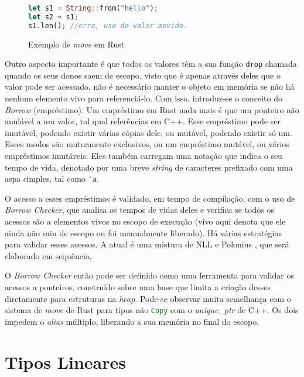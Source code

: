 \begin{figure}[ht]
	\caption{Exemplo de \emph{move} em Rust}
	\label{fig:ex:move}
	\begin{lstlisting}[language=Rust]
let s1 = String::from("hello");
let s2 = s1;
s1.len(); //erro, uso de valor movido.
	\end{lstlisting}
\end{figure}

Outro aspecto importante é que todos os valores têm a sua função \lstinline[language=Rust]|drop| chamada quando os seus donos saem de escopo, visto que é apenas através deles que o valor pode ser acessado, não é necessário manter o objeto em memória se não há nenhum elemento vivo para referenciá-lo. Com isso, introduz-se o conceito do \emph{Borrow} (empréstimo). Um empréstimo em Rust nada mais é que um ponteiro não anulável a um valor, tal qual referências em C++. Esse empréstimo pode ser imutável, podendo existir várias cópias dele, ou mutável, podendo existir só um. Esses modos são mutuamente exclusivos, ou um empréstimo mutável, ou vários empréstimos imutáveis. Eles também carregam uma notação que indica o seu tempo de vida, denotado por uma breve \emph{string} de caracteres prefixado com uma aspa simples, tal como \lstinline[language=Rust]|'a|.

O acesso a esses empréstimos é validado, em tempo de compilação, com o uso de \emph{Borrow Checker}, que analisa os tempos de vidas deles e verifica se todos os acessos são a elementos vivos no escopo de execução (vivo aqui denota que ele ainda não saiu de escopo ou foi manualmente liberado). Há várias estratégias para validar esses acessos. A atual é uma mistura de NLL \cite{NLL} e Polonius \cite{Stjerna1684081}, que será elaborado em sequência.

O \emph{Borrow Checker} então pode ser definido como uma ferramenta para validar os acessos a ponteiros, construído sobre uma base que limita a criação desses diretamente para estruturas na \emph{heap}. Pode-se observar muita semelhança com o sistema de \emph{move} de Rust para tipos não \lstinline[language=Rust]|Copy| com o \emph{unique\_ptr} de C++. Os dois impedem o \emph{alias} múltiplo, liberando a sua memória no final do escopo. 

\section{Tipos Lineares}

